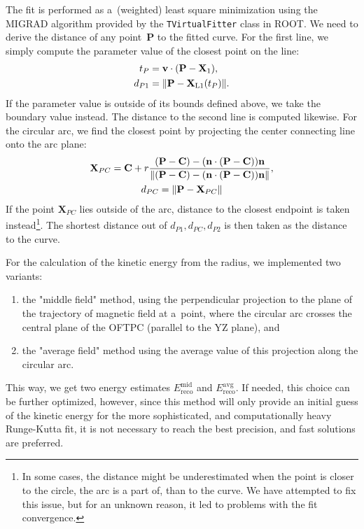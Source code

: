 			The fit is performed as a~(weighted) least square minimization using the MIGRAD algorithm provided by the \texttt{TVirtualFitter} class in ROOT. We need to derive the distance of any point~$\mathbf{P}$ to the fitted curve. For the first line, we simply compute the parameter value of the closest point on the line:
				\begin{equation}
					\label{eq:segdist}
					\begin{aligned}
						t_P &= \mathbf{v}\cdot(\mathbf{P}-\mathbf{X}_1),\\
						d_{P1} &= \norm{\mathbf{P}-\mathbf{X}_\text{L1}(t_P)}.
					\end{aligned}
				\end{equation}
			If the parameter value is outside of its bounds defined above, we take the boundary value instead. The distance to the second line is computed likewise. For the circular arc, we find the closest point by projecting the center connecting line onto the arc plane:
				\begin{gather}
					\mathbf{X}_{PC} = \mathbf{C} + r\frac{(\mathbf{P}-\mathbf{C})-(\mathbf{n}\cdot(\mathbf{P}-\mathbf{C}))\mathbf{n}}{\norm{(\mathbf{P}-\mathbf{C})-(\mathbf{n}\cdot(\mathbf{P}-\mathbf{C}))\mathbf{n}}},\\
					d_{PC} = \norm{\mathbf{P}-\mathbf{X}_{PC}}
				\end{gather}
			If the point $\mathbf{X}_{PC}$ lies outside of the arc, distance to the closest endpoint is taken instead\footnote{In some cases, the distance might be underestimated when the point is closer to the circle, the arc is a part of, than to the curve. We have attempted to fix this issue, but for an unknown reason, it led to problems with the fit convergence.}. The shortest distance out of $d_{P1},d_{PC},d_{P2}$ is then taken as the distance to the curve.
			
			For the calculation of the kinetic energy from the radius, we implemented two variants:
				\begin{enumerate}[nosep]
				 	\item the "middle field" method, using the perpendicular projection to the plane of the trajectory of magnetic field at a~point, where the circular arc crosses the central plane of the \ac{OFTPC} (parallel to the YZ plane), and
				 	\item the "average field" method using the average value of this projection along the circular arc.
				\end{enumerate}
			This way, we get two energy estimates $E_{\text{reco}}^{\text{mid}}$ and $E_{\text{reco}}^{\text{avg}}$. If needed, this choice can be further optimized, however, since this method will only provide an initial guess of the kinetic energy for the more sophisticated, and computationally heavy Runge-Kutta fit, it is not necessary to reach the best precision, and fast solutions are preferred.
			
